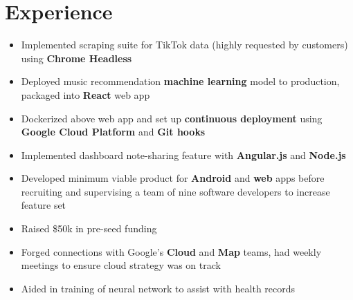 \documentclass[]{houston-ethan-resume}
\begin{document}
\begin{minipage}[t]{0.66\textwidth}


\section{Experience}
	\begin{itemize}[noitemsep,topsep=0pt]
	\itemsep0em 
	\item Implemented scraping suite for TikTok data (highly requested by
		customers) using \textbf{Chrome Headless}
	\item Deployed music recommendation \textbf{machine learning} model to
		production, packaged into \textbf{React} web app
	\item Dockerized above web app and set up \textbf{continuous deployment}
		using \textbf{Google Cloud Platform} and \textbf{Git hooks}
	\item Implemented dashboard note-sharing feature with
		\textbf{Angular.js} and \textbf{Node.js}
	\end{itemize}

	\sectionsep

	\begin{itemize}[noitemsep,topsep=0pt]
	\itemsep0em 
	\item Developed minimum viable product for \textbf{Android} and \textbf{web} apps before recruiting and supervising a team of nine software developers to increase feature set
    \item Raised \$50k in pre-seed funding
	\item Forged connections with Google’s \textbf{Cloud} and \textbf{Map} teams, had weekly meetings to ensure cloud strategy was on track
	\end{itemize}

	\sectionsep

	\begin{itemize}[noitemsep,topsep=0pt]
	\itemsep0em 
	\item Aided in training of neural network to assist with health records
	\end{itemize}


\end{minipage}
\end{document}
